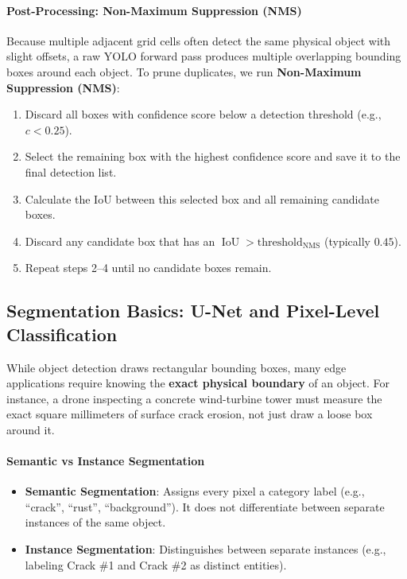 \paragraph{Post-Processing: Non-Maximum Suppression (NMS)}
Because multiple adjacent grid cells often detect the same physical object with slight offsets, a raw YOLO forward pass produces multiple overlapping bounding boxes around each object. To prune duplicates, we run \textbf{Non-Maximum Suppression (NMS)}:
\begin{enumerate}
    \item Discard all boxes with confidence score below a detection threshold (e.g., $c < 0.25$).
    \item Select the remaining box with the highest confidence score and save it to the final detection list.
    \item Calculate the IoU between this selected box and all remaining candidate boxes.
    \item Discard any candidate box that has an $\operatorname{IoU} > \text{threshold}_{\text{NMS}}$ (typically $0.45$).
    \item Repeat steps 2--4 until no candidate boxes remain.
\end{enumerate}

\subsection{Segmentation Basics: U-Net and Pixel-Level Classification}\label{subsec:segmentation}

While object detection draws rectangular bounding boxes, many edge applications require knowing the \textbf{exact physical boundary} of an object. For instance, a drone inspecting a concrete wind-turbine tower must measure the exact square millimeters of surface crack erosion, not just draw a loose box around it.

\paragraph{Semantic vs Instance Segmentation}
\begin{itemize}
    \item \textbf{Semantic Segmentation}: Assigns every pixel a category label (e.g., ``crack'', ``rust'', ``background''). It does not differentiate between separate instances of the same object.
    \item \textbf{Instance Segmentation}: Distinguishes between separate instances (e.g., labeling Crack \#1 and Crack \#2 as distinct entities).
\end{itemize}

